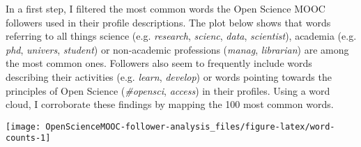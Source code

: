 \documentclass[]{article}
\newenvironment{Shaded}{\begin{snugshade}}{\end{snugshade}}
\newcommand{\KeywordTok}[1]{\textcolor[rgb]{0.13,0.29,0.53}{\textbf{#1}}}
\newcommand{\DataTypeTok}[1]{\textcolor[rgb]{0.13,0.29,0.53}{#1}}
\newcommand{\DecValTok}[1]{\textcolor[rgb]{0.00,0.00,0.81}{#1}}
\newcommand{\FloatTok}[1]{\textcolor[rgb]{0.00,0.00,0.81}{#1}}
\newcommand{\StringTok}[1]{\textcolor[rgb]{0.31,0.60,0.02}{#1}}
\newcommand{\CommentTok}[1]{\textcolor[rgb]{0.56,0.35,0.01}{\textit{#1}}}
\newcommand{\OtherTok}[1]{\textcolor[rgb]{0.56,0.35,0.01}{#1}}
\newcommand{\OperatorTok}[1]{\textcolor[rgb]{0.81,0.36,0.00}{\textbf{#1}}}
\newcommand{\NormalTok}[1]{#1}
\begin{document}
In a first step, I filtered the most common words the Open Science MOOC
followers used in their profile descriptions. The plot below shows that
words referring to all things science (e.g. \emph{research},
\emph{scienc}, \emph{data}, \emph{scientist}), academia (e.g.
\emph{phd}, \emph{univers}, \emph{student}) or non-academic professions
(\emph{manag}, \emph{librarian}) are among the most common ones.
Followers also seem to frequently include words describing their
activities (e.g. \emph{learn}, \emph{develop}) or words pointing towards
the principles of Open Science (\emph{\#opensci}, \emph{access}) in
their profiles. Using a word cloud, I corroborate these findings by
mapping the 100 most common words.

\begin{Shaded}
\end{Shaded}

\begin{center}\texttt{[image: OpenScienceMOOC-follower-analysis\_files/figure-latex/word-counts-1]} \end{center}
\end{document}
